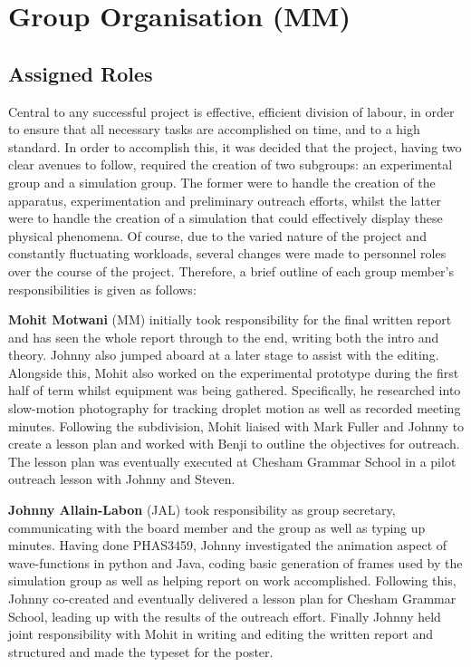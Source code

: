 \section{Group Organisation (MM)}
\subsection{Assigned Roles}
Central to any successful project is effective, efficient division of labour, in order to ensure that all necessary tasks are accomplished on time, and to a high standard. In order to accomplish this, it was decided that the project, having two clear avenues to follow, required the creation of two subgroups: an experimental group and a simulation group. The former were to handle the creation of the apparatus, experimentation and preliminary outreach efforts, whilst the latter were to handle the creation of a simulation that could effectively display these physical phenomena. Of course, due to the varied nature of the project and constantly fluctuating workloads, several changes were made to personnel roles over the course of the project. Therefore, a brief outline of each group member's responsibilities is given as follows:

\textbf{Mohit Motwani} (MM) initially took responsibility for the final written report and has seen the whole report through to the end, writing both the intro and theory. Johnny also jumped aboard at a later stage to assist with the editing. Alongside this, Mohit also worked on the experimental prototype during the first half of term whilst equipment was being gathered. Specifically, he researched into slow-motion photography for tracking droplet motion as well as recorded meeting minutes. Following the subdivision, Mohit liaised with Mark Fuller and Johnny to create a lesson plan and worked with Benji to outline the objectives for outreach. The lesson plan was eventually executed at Chesham Grammar School in a pilot outreach lesson with Johnny and Steven.

\textbf{Johnny Allain-Labon} (JAL) took responsibility as group secretary, communicating with the board member and the group as well as typing up minutes. Having done PHAS3459, Johnny investigated the animation aspect of wave-functions in python and Java, coding basic generation of frames used by the simulation group as well as helping report on work accomplished. Following this, Johnny co-created and eventually delivered a lesson plan for Chesham Grammar School, leading up with the results of the outreach effort. Finally Johnny held joint responsibility with Mohit in writing and editing the written report and structured and made the typeset for the poster.

